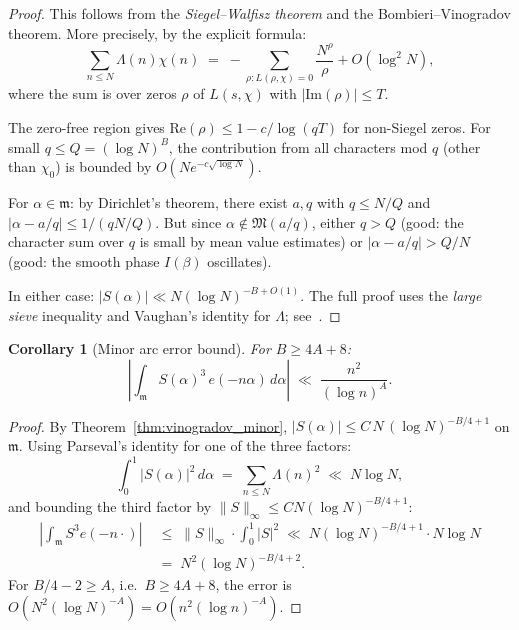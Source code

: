 \documentclass[12pt,a4paper]{amsart}
\newtheorem{corollary}[theorem]{Corollary}
\theoremstyle{definition}
\newcommand{\eq}[1]{e\!\left(#1\right)}
\begin{document}
\begin{proof}
  This follows from the \emph{Siegel--Walfisz theorem} and the
  Bombieri--Vinogradov theorem.  More precisely, by the explicit formula:
  \[
    \sum_{n \leq N} \Lambda(n)\chi(n)
    \;=\; -\sum_{\rho: L(\rho,\chi)=0} \frac{N^\rho}{\rho} + O(\log^2 N),
  \]
  where the sum is over zeros $\rho$ of $L(s,\chi)$ with $|\text{Im}(\rho)| \leq T$.

  The zero-free region gives $\text{Re}(\rho) \leq 1 - c/\log(qT)$ for
  non-Siegel zeros.  For small $q \leq Q = (\log N)^B$, the contribution
  from all characters mod $q$ (other than $\chi_0$) is bounded by
  $O(N e^{-c\sqrt{\log N}})$.

  For $\alpha \in \mathfrak{m}$: by Dirichlet's theorem, there exist
  $a, q$ with $q \leq N/Q$ and $|\alpha - a/q| \leq 1/(qN/Q)$.
  But since $\alpha \notin \mathfrak{M}(a/q)$, either $q > Q$ (good:
  the character sum over $q$ is small by mean value estimates) or
  $|\alpha - a/q| > Q/N$ (good: the smooth phase $I(\beta)$ oscillates).

  In either case: $|S(\alpha)| \ll N (\log N)^{-B+O(1)}$.
  The full proof uses the \emph{large sieve} inequality and Vaughan's
  identity for $\Lambda$; see~\cite[Chapter~5]{Vaughan1981}.
\end{proof}

\begin{corollary}[Minor arc error bound]\label{cor:minor}
  For $B \geq 4A + 8$:
  \[
    \left|\int_{\mathfrak{m}} S(\alpha)^3\, \eq{-n\alpha}\, d\alpha\right|
    \;\ll\; \frac{n^2}{(\log n)^A}.
  \]
\end{corollary}

\begin{proof}
  By Theorem~\ref{thm:vinogradov_minor}, $|S(\alpha)| \leq C\, N\, (\log N)^{-B/4+1}$
  on $\mathfrak{m}$.  Using Parseval's identity for one of the three factors:
  \[
    \int_0^1 |S(\alpha)|^2\, d\alpha \;=\; \sum_{n \leq N} \Lambda(n)^2 \;\ll\; N\log N,
  \]
  and bounding the third factor by $\|S\|_\infty \leq CN(\log N)^{-B/4+1}$:
  \begin{align*}
    \left|\int_{\mathfrak{m}} S^3 \eq{-n\cdot}\right|
    &\;\leq\; \|S\|_\infty \cdot \int_0^1 |S|^2
    \;\ll\; N (\log N)^{-B/4+1} \cdot N \log N \\
    &\;=\; N^2 (\log N)^{-B/4+2}.
  \end{align*}
  For $B/4 - 2 \geq A$, i.e.\ $B \geq 4A + 8$, the error is $O(N^2 (\log N)^{-A})
  = O(n^2 (\log n)^{-A})$.
\end{proof}
\end{document}
